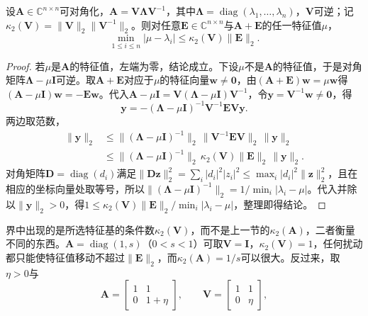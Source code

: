\begin{theorem}
\label{thm:ls-bauer-fike}
设$\bm A\in\mathbb C^{n\times n}$可对角化，$\bm A=\bm V\bm\Lambda\bm V^{-1}$，其中$\bm\Lambda=\operatorname{diag}(\lambda_1,\ldots,\lambda_n)$，$\bm V$可逆；记$\kappa_2(\bm V)=\lVert\bm V\rVert_2\lVert\bm V^{-1}\rVert_2$。则对任意$\bm E\in\mathbb C^{n\times n}$与$\bm A+\bm E$的任一特征值$\mu$，
\[
 \min_{1\leq i\leq n}|\mu-\lambda_i|\leq\kappa_2(\bm V)\lVert\bm E\rVert_2 .
\]
\end{theorem}
\begin{proof}
若$\mu$是$\bm A$的特征值，左端为零，结论成立。下设$\mu$不是$\bm A$的特征值，于是对角矩阵$\bm\Lambda-\mu\bm I$可逆。取$\bm A+\bm E$对应于$\mu$的特征向量$\bm w\neq\bm0$，由$(\bm A+\bm E)\bm w=\mu\bm w$得$(\bm A-\mu\bm I)\bm w=-\bm E\bm w$。代入$\bm A-\mu\bm I=\bm V(\bm\Lambda-\mu\bm I)\bm V^{-1}$，令$\bm y=\bm V^{-1}\bm w\neq\bm0$，得
\[
 \bm y=-(\bm\Lambda-\mu\bm I)^{-1}\bm V^{-1}\bm E\bm V\bm y .
\]
两边取范数，
\[
 \begin{aligned}
 \lVert\bm y\rVert_2
 &\leq\lVert(\bm\Lambda-\mu\bm I)^{-1}\rVert_2\,\lVert\bm V^{-1}\bm E\bm V\rVert_2\,\lVert\bm y\rVert_2\\
 &\leq\lVert(\bm\Lambda-\mu\bm I)^{-1}\rVert_2\,\kappa_2(\bm V)\lVert\bm E\rVert_2\,\lVert\bm y\rVert_2 .
 \end{aligned}
\]
对角矩阵$\bm D=\operatorname{diag}(d_i)$满足$\lVert\bm D\bm z\rVert_2^2=\sum_i|d_i|^2|z_i|^2\leq\max_i|d_i|^2\lVert\bm z\rVert_2^2$，且在相应的坐标向量处取等号，所以$\lVert(\bm\Lambda-\mu\bm I)^{-1}\rVert_2=1/\min_i|\lambda_i-\mu|$。代入并除以$\lVert\bm y\rVert_2>0$，得$1\leq\kappa_2(\bm V)\lVert\bm E\rVert_2/\min_i|\lambda_i-\mu|$，整理即得结论。
\end{proof}
界中出现的是所选特征基的条件数$\kappa_2(\bm V)$，而不是上一节的$\kappa_2(\bm A)$，二者衡量不同的东西。$\bm A=\operatorname{diag}(1,s)$（$0<s<1$）可取$\bm V=\bm I$，$\kappa_2(\bm V)=1$，任何扰动都只能使特征值移动不超过$\lVert\bm E\rVert_2$，而$\kappa_2(\bm A)=1/s$可以很大。反过来，取$\eta>0$与
\[
 \bm A=\begin{bmatrix}1&1\\0&1+\eta\end{bmatrix},\qquad
 \bm V=\begin{bmatrix}1&1\\0&\eta\end{bmatrix},
\]
